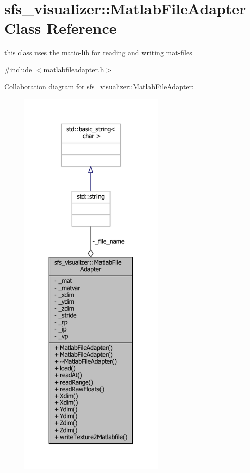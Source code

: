 \section{sfs\-\_\-visualizer\-:\-:Matlab\-File\-Adapter Class Reference}
\label{classsfs__visualizer_1_1MatlabFileAdapter}


this class uses the matio-\/lib for reading and writing mat-\/files  




{\ttfamily \#include $<$matlabfileadapter.\-h$>$}



Collaboration diagram for sfs\-\_\-visualizer\-:\-:Matlab\-File\-Adapter\-:
\nopagebreak
\begin{figure}[H]
\begin{center}
\leavevmode
\includegraphics[height=550pt]{d2/d77/classsfs__visualizer_1_1MatlabFileAdapter__coll__graph}
\end{center}
\end{figure}
